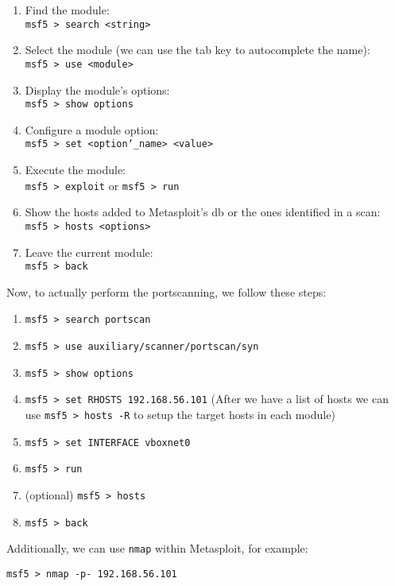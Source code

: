 \documentclass[twocolumn]{article}
\begin{document}
\begin{enumerate}
    \setlength\itemsep{-0.25em}
    \item Find the module: \\
    \texttt{msf5 > search <string>}
    \item Select the module (we can use the tab key to autocomplete the name): \\
    \texttt{msf5 > use <module>} 
    \item Display the module's options: \\
    \texttt{msf5 > show options}
    \item Configure a module option:\\
    \texttt{msf5 > set <option\char`\_name> <value>}
    \item Execute the module: \\
    \texttt{msf5 > exploit} or \texttt{msf5 > run}
    \item Show the hosts added to Metasploit's db or the ones identified in a scan: \\
    \texttt{msf5 > hosts <options>}
    \item Leave the current module: \\
    \texttt{msf5 > back}
\end{enumerate}

\noindent Now, to actually perform the portscanning, we follow these steps:

\begin{enumerate}
    \setlength\itemsep{-0.25em}
    \item \texttt{msf5 > search portscan}
    \item \texttt{msf5 > use auxiliary/scanner/portscan/syn}
    \item \texttt{msf5 > show options}
    \item \texttt{msf5 > set RHOSTS 192.168.56.101} (After we have a list of hosts we can use \texttt{msf5 > hosts -R} to setup the target hosts in each module)
    \item \texttt{msf5 > set INTERFACE vboxnet0}
    \item \texttt{msf5 > run}
    \item (optional) \texttt{msf5 > hosts}
    \item \texttt{msf5 > back}
\end{enumerate}

\noindent Additionally, we can use \texttt{nmap} within Metasploit, for example:

\indent\texttt{msf5 > nmap -p- 192.168.56.101}\\
\end{document}
